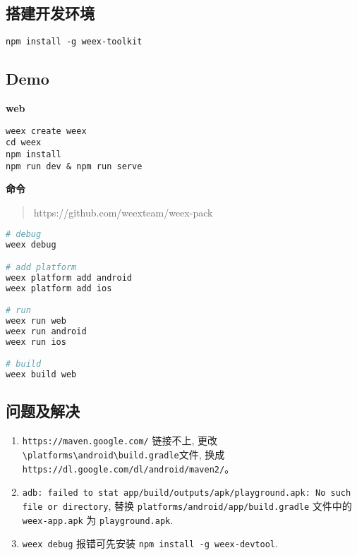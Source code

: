 \subsection{搭建开发环境}\label{ux642dux5efaux5f00ux53d1ux73afux5883}

\begin{lstlisting}
npm install -g weex-toolkit
\end{lstlisting}

\subsection{Demo}\label{demo}

\textbf{web}

\begin{lstlisting}
weex create weex
cd weex
npm install
npm run dev & npm run serve
\end{lstlisting}

\textbf{命令}

\begin{quote}
https://github.com/weexteam/weex-pack
\end{quote}

\begin{lstlisting}[language=bash]
# debug
weex debug

# add platform
weex platform add android
weex platform add ios

# run
weex run web
weex run android
weex run ios

# build
weex build web
\end{lstlisting}

\subsection{问题及解决}\label{ux95eeux9898ux53caux89e3ux51b3-1}

\begin{enumerate}
\def\labelenumi{\arabic{enumi}.}
\tightlist
\item
  \lstinline!https://maven.google.com/! 链接不上,
  更改\lstinline!\platforms\android\build.gradle!文件, 换成
  \lstinline!https://dl.google.com/dl/android/maven2/!。
\item
  \lstinline!adb: failed to stat app/build/outputs/apk/playground.apk: No such file or directory!,
  替换 \lstinline!platforms/android/app/build.gradle! 文件中的
  \lstinline!weex-app.apk! 为 \lstinline!playground.apk!.
\item
  \lstinline!weex debug! 报错可先安装
  \lstinline!npm install -g weex-devtool!.
\end{enumerate}

